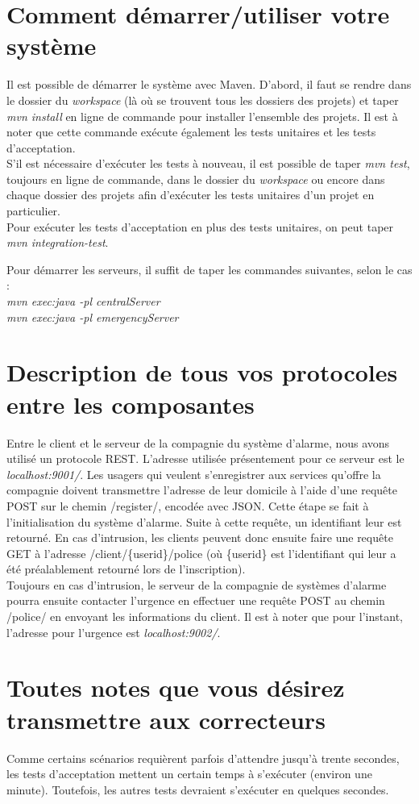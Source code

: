 \section*{Comment démarrer/utiliser votre système}
Il est possible de démarrer le système avec Maven. D'abord, il faut se rendre dans le dossier du \emph{workspace} (là où se trouvent tous les dossiers des projets) et taper \emph{mvn install} en ligne de commande pour installer l'ensemble des projets. Il est à noter que cette commande exécute également les tests unitaires et les tests d'acceptation.\\
S'il est nécessaire d'exécuter les tests à nouveau, il est possible de taper \emph{mvn test}, toujours en ligne de commande, dans le dossier du \emph{workspace} ou encore dans chaque dossier des projets afin d'exécuter les tests unitaires d'un projet en particulier.\\
Pour exécuter les tests d'acceptation en plus des tests unitaires, on peut taper \emph{mvn integration-test}.

Pour démarrer les serveurs, il suffit de taper les commandes suivantes, selon le cas :\\
\emph{mvn exec:java -pl centralServer}\\
\emph{mvn exec:java -pl emergencyServer}

\section*{Description de tous vos protocoles entre les composantes}
Entre le client et le serveur de la compagnie du système d'alarme, nous avons utilisé un protocole REST. L'adresse utilisée présentement pour ce serveur est le \emph{localhost:9001/}. Les usagers qui veulent s'enregistrer aux services qu'offre la compagnie doivent transmettre l'adresse de leur domicile à l'aide d'une requête POST sur le chemin /register/, encodée avec JSON. Cette étape se fait à l'initialisation du système d'alarme. Suite à cette requête, un identifiant leur est retourné. En cas d'intrusion, les clients peuvent donc ensuite faire une requête GET à l'adresse /client/\{userid\}/police (où \{userid\} est l'identifiant qui leur a été préalablement retourné lors de l'inscription). \\

Toujours en cas d'intrusion, le serveur de la compagnie de systèmes d'alarme pourra ensuite contacter l'urgence en effectuer une requête POST au chemin /police/ en envoyant les informations du client. Il est à noter que pour l'instant, l'adresse pour l'urgence est \emph{localhost:9002/}.

\section*{Toutes notes que vous désirez transmettre aux correcteurs}
Comme certains scénarios requièrent parfois d'attendre jusqu'à trente secondes, les tests d'acceptation mettent un certain temps à s'exécuter (environ une minute). Toutefois, les autres tests devraient s'exécuter en quelques secondes.
